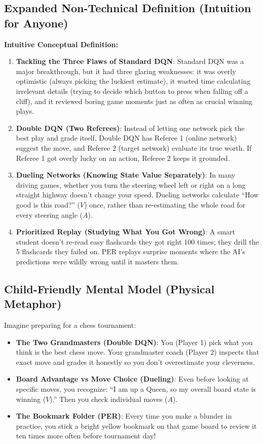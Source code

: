 \documentclass[11pt,a4paper]{article}
\theoremstyle{definition}
\begin{document}
\subsection{Expanded Non-Technical Definition (Intuition for Anyone)}
\textbf{Intuitive Conceptual Definition:}
\begin{enumerate}
    \item \textbf{Tackling the Three Flaws of Standard DQN}: Standard DQN was a major breakthrough, but it had three glaring weaknesses: it was overly optimistic (always picking the luckiest estimate), it wasted time calculating irrelevant details (trying to decide which button to press when falling off a cliff), and it reviewed boring game moments just as often as crucial winning plays.
    \item \textbf{Double DQN (Two Referees)}: Instead of letting one network pick the best play and grade itself, Double DQN has Referee 1 (online network) suggest the move, and Referee 2 (target network) evaluate its true worth. If Referee 1 got overly lucky on an action, Referee 2 keeps it grounded.
    \item \textbf{Dueling Networks (Knowing State Value Separately)}: In many driving games, whether you turn the steering wheel left or right on a long straight highway doesn't change your speed. Dueling networks calculate ``How good is this road?'' ($V$) once, rather than re-estimating the whole road for every steering angle ($A$).
    \item \textbf{Prioritized Replay (Studying What You Got Wrong)}: A smart student doesn't re-read easy flashcards they got right 100 times; they drill the 5 flashcards they failed on. PER replays surprise moments where the AI's predictions were wildly wrong until it masters them.
\end{enumerate}

\subsection{Child-Friendly Mental Model (Physical Metaphor)}
Imagine preparing for a chess tournament:
\begin{itemize}
    \item \textbf{The Two Grandmasters (Double DQN)}: You (Player 1) pick what you think is the best chess move. Your grandmaster coach (Player 2) inspects that exact move and grades it honestly so you don't overestimate your cleverness.
    \item \textbf{Board Advantage vs Move Choice (Dueling)}: Even before looking at specific moves, you recognize: ``I am up a Queen, so my overall board state is winning ($V$).'' Then you check individual moves ($A$).
    \item \textbf{The Bookmark Folder (PER)}: Every time you make a blunder in practice, you stick a bright yellow bookmark on that game board to review it ten times more often before tournament day!
\end{itemize}
\end{document}

